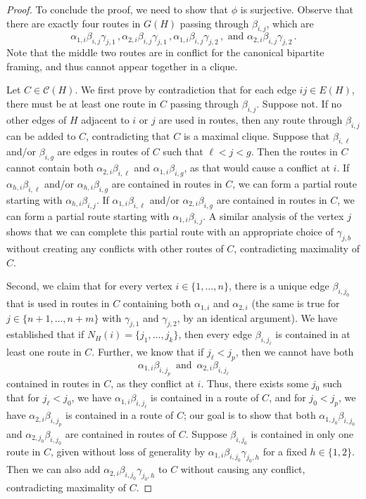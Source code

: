 \documentclass[12pt]{amsart}
\theoremstyle{definition}
\newcommand{\cliques}{\mathcal{C}}
\begin{document}
\begin{proof}
To conclude the proof, we need to show that $\phi$ is surjective.
Observe that there are exactly four routes in $G(H)$ passing through $\beta_{i,j}$, which are
\begin{equation}\label{eq:fourroutes}
\alpha_{1,i}\beta_{i,j}\gamma_{j,1} \, , \alpha_{2,i}\beta_{i,j}\gamma_{j,1} \, , \alpha_{1,i}\beta_{i,j}\gamma_{j,2} \, , \text{ and }\alpha_{2,i}\beta_{i,j}\gamma_{j,2} \, .
\end{equation}
Note that the middle two routes are in conflict for the canonical bipartite framing, and thus cannot appear together in a clique.

Let $C\in \cliques(H)$.
We first prove by contradiction that for each edge $ij\in E(H)$, there must be at least one route in $C$ passing through $\beta_{i,j}$.
Suppose not.
If no other edges of $H$ adjacent to $i$ or $j$ are used in routes, then any route through $\beta_{i,j}$ can be added to $C$, contradicting that $C$ is a maximal clique.
Suppose that $\beta_{i,\ell}$ and/or $\beta_{i,g}$ are edges in routes of $C$ such that $\ell<j<g$.
Then the routes in $C$ cannot contain both $\alpha_{2,i}\beta_{i,\ell}$ and $\alpha_{1,i}\beta_{i,g}$, as that would cause a conflict at $i$.
If $\alpha_{h,i}\beta_{i,\ell}$ and/or $\alpha_{h,i}\beta_{i,g}$ are contained in routes in $C$, we can form a partial route starting with $\alpha_{h,i}\beta_{i,j}$.
If $\alpha_{1,i}\beta_{i,\ell}$ and/or $\alpha_{2,i}\beta_{i,g}$ are contained in routes in $C$, we can form a partial route starting with $\alpha_{1,i}\beta_{i,j}$.
A similar analysis of the vertex $j$ shows that we can complete this partial route with an appropriate choice of $\gamma_{j,b}$ without creating any conflicts with other routes of $C$, contradicting maximality of $C$.

Second, we claim that for every vertex $i\in \{1,\ldots,n\}$, there is a unique edge $\beta_{i,j_0}$ that is used in routes in $C$ containing both $\alpha_{1,i}$ and $\alpha_{2,i}$ (the same is true for $j\in\{n+1,\ldots,n+m\}$ with $\gamma_{j,1}$ and $\gamma_{j,2}$, by an identical argument).
We have established that if $N_H(i)=\{j_1,\ldots,j_k\}$, then every edge $\beta_{i,j_\ell}$ is contained in at least one route in $C$.
Further, we know that if $j_\ell<j_p$, then we cannot have both 
\[
\alpha_{1,i}\beta_{i,j_p} \, \text{ and } \, \alpha_{2,i}\beta_{i,j_\ell}
\]
contained in routes in $C$, as they conflict at $i$.
Thus, there exists some $j_0$ such that for $j_\ell<j_0$, we have $\alpha_{1,i}\beta_{i,j_\ell}$ is contained in a route of $C$, and for $j_0<j_p$, we have $\alpha_{2,i}\beta_{i,j_p}$ is contained in a route of $C$; our goal is to show that both $\alpha_{1,j_0}\beta_{i,j_0}$ and $\alpha_{2,j_0}\beta_{i,j_0}$ are contained in routes of $C$.
Suppose $\beta_{i,j_0}$ is contained in only one route in $C$, given without loss of generality by $\alpha_{1,i}\beta_{i,j_0}\gamma_{j_0,h}$ for a fixed $h\in \{1,2\}$.
Then we can also add $\alpha_{2,i}\beta_{i,j_0}\gamma_{j_0,h}$ to $C$ without causing any conflict, contradicting maximality of $C$.


\end{proof}
\end{document}
